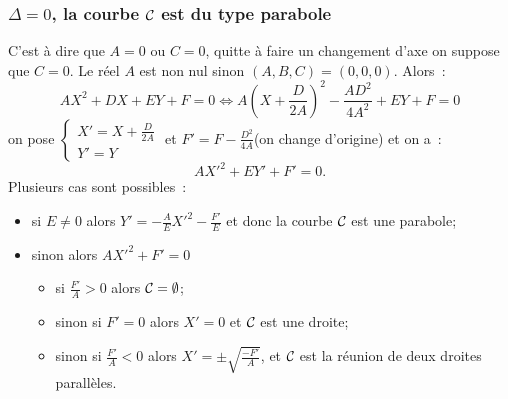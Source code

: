 \subsubsection{\(\Delta=0\), la courbe \(\mathcal{C}_{{}}\) est du type parabole}
C'est à dire que \(A=0\) ou \(C=0\), quitte à faire un changement d'axe on 
suppose que \(C=0\). Le réel \(A\) est non nul sinon \((A,B,C)=(0,0,0)\). 
Alors~:
\begin{equation}
  AX^2+DX+EY+F=0 \iff A\left(X+\frac{D}{2A}\right)^2-\frac{AD^2}{4A^2}+EY+F=0
\end{equation}
on pose \(\begin{cases}X'=X+\frac{D}{2A} \\ Y'=Y\end{cases}\) et 
\(F'=F-\frac{D^2}{4A}\)(on change d'origine) et on a~:
\begin{equation}
  AX'^2+EY'+F'=0.
\end{equation}
Plusieurs cas sont possibles~:
\begin{itemize}
  \item si \(E \neq 0\) alors \(Y'=-\frac{A}{E}X'^2-\frac{F'}{E}\) et donc la 
    courbe \(\mathcal{C}_{{}}\) est une parabole;
  \item sinon alors \(AX'^2+F'=0\)
    \begin{itemize}
      \item si \(\frac{F'}{A}>0\) alors \(\mathcal{C}_{{}}=\emptyset\);
      \item sinon si \(F'=0\) alors \(X'=0\) et \(\mathcal{C}_{{}}\) est une droite;
      \item sinon si \(\frac{F'}{A}<0\) alors \(X'=\pm \sqrt{\frac{-F'}{A}}\), 
        et \(\mathcal{C}_{{}}\) est la réunion de deux droites parallèles.
    \end{itemize}
\end{itemize}

